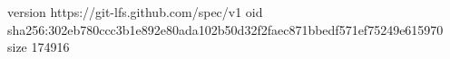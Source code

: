 version https://git-lfs.github.com/spec/v1
oid sha256:302eb780ccc3b1e892e80ada102b50d32f2faec871bbedf571ef75249e615970
size 174916
